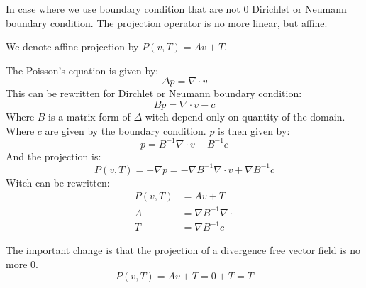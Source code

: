   In case where we use boundary condition that are not 0 Dirichlet or Neumann boundary condition.
  The projection operator is no more linear, but affine.

  \begin{definition}
  We denote affine projection by $P(v,T)=Av+T$.
  
  The Poisson's equation is given by:
  \begin{equation}
   \Delta p=\nabla \cdot v
  \end{equation}
This can be rewritten for Dirchlet or Neumann boundary condition:
\begin{equation}
 B p=\nabla \cdot v-c
\end{equation}
Where $B$ is a matrix form of $\Delta$ witch depend only on quantity of the domain.
Where $c$ are given by the boundary condition.
$p$ is then given by:
\begin{equation}
 p=B^{-1} \nabla \cdot v-B^{-1}c
\end{equation}
And the projection is:
\begin{equation}
 P(v,T)=-\nabla p=-\nabla B^{-1}\nabla \cdot v+\nabla B^{-1}c
\end{equation}
Witch can be rewritten:
\begin{align}
P(v,T)&=Av+T\\
A&=\nabla B^{-1}\nabla \cdot\\
T&=\nabla B^{-1}c
\end{align}
  
  \end{definition}
  
  The important change is that the projection of a divergence free vector field is no more 0.
  \begin{equation}
  P(v,T)=Av+T=0+T=T
  \end{equation}



